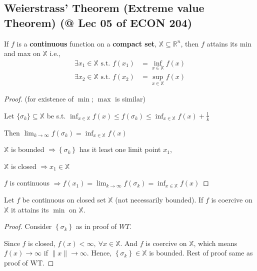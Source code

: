 \documentclass[11pt]{elegantbook}
\begin{document}
\subsection{Weierstrass' Theorem (Extreme value Theorem) \small{(@ Lec 05 of ECON 204)}}
\begin{theorem}
    \quad

    If $f$ is a \textbf{continuous} function on a \textbf{compact set}, $\mathbb{X} \subseteq \mathbb{R}^{n}$, then $f$ attains its min and max on $\mathbb{X}$ i.e.,
    $$
    \begin{aligned}
    \exists x_1 \in \mathbb{X} \text { s.t. } f\left(x_{1}\right) &=\inf _{x \in \mathbb{X}} f(x) \\
    \exists x_{2} \in \mathbb{X} \text { s.t. } f\left(x_{2}\right) &=\sup _{x \in \mathbb{X}} f(x)
    \end{aligned}
    $$
\end{theorem}
\begin{proof}
    (for existence of $\min$; $\max$ is similar)

    Let $\{\sigma_k\}\subseteq \mathbb{X}$ be s.t.
    $\inf_{x\in\mathbb{X}} f(x) \leq f\left(\sigma_{k}\right) \leq \inf _{x \in \mathbb{X}} f(x)+\frac{1}{k}$

    Then $\lim _{k \rightarrow \infty} f\left(\sigma_{k}\right)=\inf_{x\in\mathbb{X}} f(x)$

    $\mathbb{X}$ is bounded $\Rightarrow\left\{\sigma_{k}\right\}$ has it least one limit point $x_1$,

    $\mathbb{X}$ is closed $\Rightarrow x_{1} \in \mathbb{X}$

    $f$ is continuous $\Rightarrow f\left(x_{1}\right)=\lim _{k \rightarrow \infty} f\left(\sigma_{k}\right)=\inf _{x \in \mathbb{X}} f(x)$
\end{proof}

\begin{corollary}[Corollary to WT]
    Let $f$ be continuous on closed set $\mathbb{X}$ (not necessarily bounded). If $f$ is coercive on $\mathbb{X}$ it attains its $\min$ on $\mathbb{X}$.
\end{corollary}
\begin{proof}
    Consider $\left\{\sigma_{k}\right\}$ as in proof of $WT$.

    Since $f$ is closed, $f(x)<\infty,\ \forall x\in\mathbb{X}$. And $f$ is coercive on $\mathbb{X}$, which means $f(x)\rightarrow \infty$ if $\|x\| \rightarrow\infty$. Hence, $\left\{\sigma_{k}\right\}\in\mathbb{X}$ is bounded. Rest of proof same as proof of $\mathrm{WT}$.
\end{proof}
\end{document}
